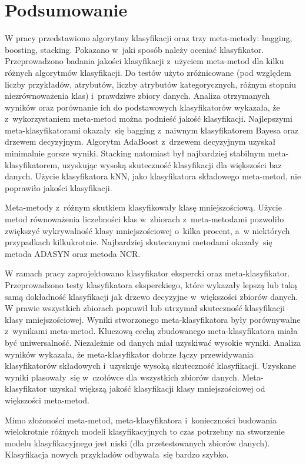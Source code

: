\chapter{Podsumowanie}
W pracy przedstawiono algorytmy klasyfikacji oraz trzy meta-metody: bagging, boosting, stacking. Pokazano w~jaki sposób należy oceniać klasyfikator. Przeprowadzono badania jakości klasyfikacji z~użyciem meta-metod dla kilku różnych algorytmów klasyfikacji. Do testów użyto zróżnicowane (pod względem liczby przykładów, atrybutów, liczby atrybutów kategorycznych, różnym stopniu niezrównoważenia klas) i~prawdziwe zbiory danych. Analiza otrzymanych wyników oraz porównanie ich do podstawowych klasyfikatorów wykazała, że z~wykorzystaniem meta-metod można podnieść jakość klasyfikacji. Najlepszymi meta-klasyfikatorami okazały~się bagging z~naiwnym klasyfikatorem Bayesa oraz drzewem decyzyjnym. Algorytm AdaBoost z~drzewem decyzyjnym uzyskał minimalnie gorsze wyniki. Stacking natomiast był najbardziej stabilnym meta-klasyfikatorem, uzyskując wysoką skuteczność klasyfikacji dla większości baz danych. Użycie klasyfikatora kNN, jako klasyfikatora składowego meta-metod, nie poprawiło jakości klasyfikacji.\par
Meta-metody z~różnym skutkiem klasyfikowały klasę mniejszościową. Użycie metod równoważenia liczebności klas w~zbiorach z~meta-metodami pozwoliło zwiększyć wykrywalność klasy mniejszościowej o~kilka procent, a~w niektórych przypadkach kilkukrotnie. Najbardziej skutecznymi metodami okazały~się metoda ADASYN oraz metoda NCR. \par
W ramach pracy zaprojektowano klasyfikator ekspercki oraz meta-klasyfikator. Przeprowadzono testy klasyfikatora eksperckiego, które wykazały lepszą lub taką samą dokładność klasyfikacji jak drzewo decyzyjne w~większości zbiorów danych. W prawie wszystkich zbiorach poprawił lub utrzymał skuteczność klasyfikacji klasy mniejszościowej. Wyniki stworzonego meta-klasyfikatora były porównywalne z~wynikami meta-metod. Kluczową cechą zbudowanego meta-klasyfikatora miała być uniwersalność. Niezależnie od danych miał uzyskiwać wysokie wyniki. Analiza wyników wykazała, że meta-klasyfikator dobrze łączy przewidywania klasyfikatorów składowych i~uzyskuje wysoką skuteczność klasyfikacji. Uzyskane wyniki plasowały~się w~czołówce dla wszystkich zbiorów danych. Meta-klasyfikator uzyskał większą jakość klasyfikacji klasy mniejszościowej od większości meta-metod. \par
Mimo złożoności meta-metod, meta-klasyfikatora i~konieczności budowania wielokrotnie różnych modeli klasyfikacyjnych to czas potrzebny na stworzenie modelu klasyfikacyjnego jest niski (dla przetestowanych zbiorów danych). Klasyfikacja nowych przykładów odbywała~się bardzo szybko. \par
